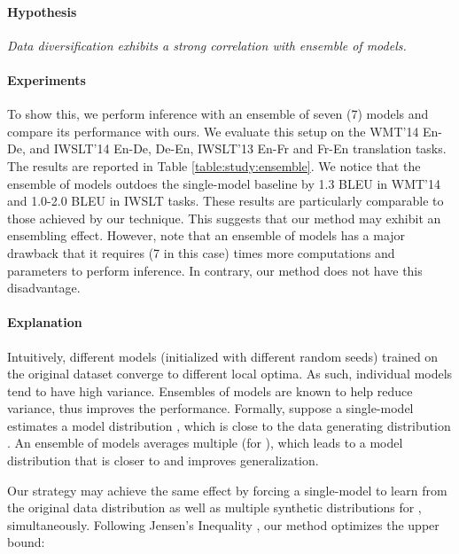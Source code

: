 \documentclass{article}
\begin{document}
\paragraph{Hypothesis} \emph{Data diversification exhibits a strong correlation with ensemble of models.}

\vspace{-0.5em}
\paragraph{Experiments}



To show this, we perform inference with an ensemble of seven (7) models and compare its performance with ours. We evaluate this setup on the WMT'14 En-De, and IWSLT'14 En-De, De-En, IWSLT'13 En-Fr and Fr-En translation tasks. The results are reported in Table \ref{table:study:ensemble}. We notice that the ensemble of models outdoes the single-model baseline by 1.3 BLEU in WMT'14 and 1.0-2.0 BLEU in IWSLT tasks. These results are particularly comparable to those achieved by our technique. This suggests that our method may exhibit an ensembling effect. However, note that an ensemble of models has a major drawback that it requires  (7 in this case) times more computations and parameters to perform inference. In contrary, our method does not have this disadvantage.


\vspace{-0.5em}
\paragraph{Explanation} 


{Intuitively, different models (initialized with different random seeds) trained on the original dataset converge to different local optima.} As such, individual models tend to have high variance. Ensembles of models are known to help reduce variance, thus improves the performance. {Formally, suppose a single-model  estimates a model distribution , which is close to the data generating distribution .} An ensemble of models averages multiple  (for ), which leads to a model distribution that is closer to  and improves generalization.

Our strategy may achieve the same effect by forcing a single-model  to learn from the original data distribution  as well as multiple synthetic distributions  for , simultaneously. Following Jensen's Inequality \citep{jensen1906fonctions}, our method optimizes the upper bound:
\vspace{-0.5em}
\end{document}
